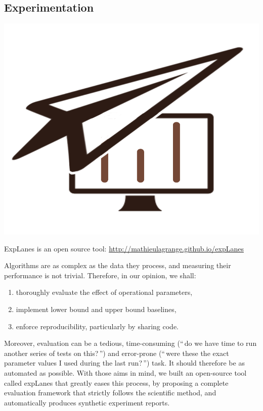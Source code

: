 \documentclass[a4paper,fleqn]{tufte-handout}
\begin{document}
\subsection{Experimentation}

\begin{marginfigure}
\begin{center}
\includegraphics[width=\textwidth]{figures/logo} 
\end{center}
\caption{\label{fig:explanes} ExpLanes is an open source tool: \url{http://mathieulagrange.github.io/expLanes}}
\end{marginfigure}

Algorithms are as complex as the data they process, and measuring their performance is not trivial. Therefore, in our opinion, we shall:
\begin{enumerate}
\itemsep-.2em 
\item thoroughly evaluate the effect of operational parameters,
\item implement lower bound and upper bound baselines,
\item enforce reproducibility, particularly by sharing code.
\end{enumerate}

Moreover, evaluation can be a tedious, time-consuming (``\,do we have time to run another series of tests on this?\,'') and error-prone (``\,were these the exact parameter values I used during the last run?\,'') task. It should therefore be as automated as possible. With those aims in mind, we built an open-source tool called \textsf{expLanes} that greatly eases this process, by proposing a complete evaluation framework that strictly follows the scientific method, and automatically produces synthetic experiment reports.%
  
 
  
\end{document}
